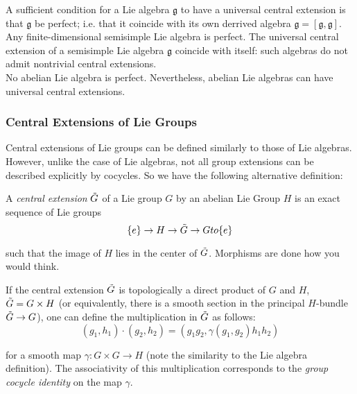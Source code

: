 \begin{rmk}

	A sufficient condition for a Lie algebra $ \mathfrak{g}$ to have a universal central extension is that $ \mathfrak{g}$ be perfect; i.e. that it coincide with its own derrived algebra $ \mathfrak{g} = [ \mathfrak{g}, \mathfrak{g}]$. Any finite-dimensional semisimple Lie algebra is perfect. The universal central extension of a semisimple Lie algebra $ \mathfrak{g}$ coincide with itself: such algebras do not admit nontrivial central extensions. \\
	\indent No abelian Lie algebra is perfect. Nevertheless, abelian Lie algebras can have universal central extensions.

\end{rmk}

\subsubsection{Central Extensions of Lie Groups}

Central extensions of Lie groups can be defined similarly to those of Lie algebras. However, unlike the case of Lie algebras, not all group extensions can be described explicitly by cocycles. So we have the following alternative definition:



\begin{defn}

	A \textit{central extension} $ \Tilde{G}$ of a Lie group $G$ by an abelian Lie Group $H$ is an exact sequence of Lie groups
	\[
		\{ e \} \to H \to \Tilde{G} \to G to \{ e \} 
	\]

such that the image of $H$ lies in the center of $\Tilde{G}$. Morphisms are done how you would think.
\end{defn}

\indent If the central extension $ \Tilde{ G }$ is topologically a direct product of $G$ and $H$, $ \Tilde{ G }= G \times H$ (or equivalently, there is a smooth section in the principal $H$-bundle $ \Tilde{ G } \to G$), one can define the multiplication in $ \Tilde{ G }$ as follows:
\[
	(g_1, h_1) \cdot (g_2, h_2) = (g_1 g_2, \gamma (g_1, g_2) h_1 h_2)
\]

for a smooth map $ \gamma: G \times G \to H$ (note the similarity to the Lie algebra definition). The associativity of this multiplication corresponds to the \textit{group cocycle identity} on the map $ \gamma$.


